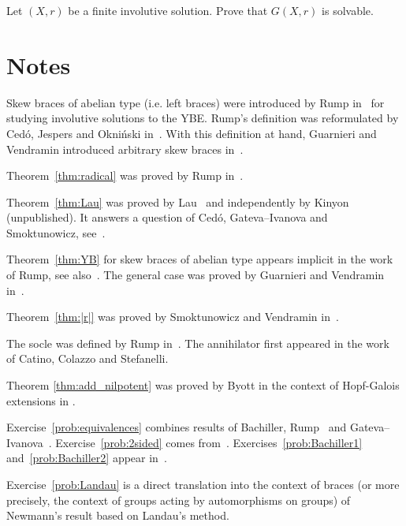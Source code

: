 \begin{prob}
\label{prob:G(X,r)solvable}
Let $(X,r)$ be a finite involutive solution. Prove that $G(X,r)$ is solvable. 
\end{prob}


\section*{Notes}

Skew braces of abelian type (i.e. left braces) were introduced by Rump in~\cite{MR2278047} for studying involutive
solutions to the YBE. 
Rump's definition was reformulated  
by Ced\'o, Jespers and Okni\'nski in~\cite{MR3177933}. With this definition at hand, 
Guarnieri and Vendramin introduced 
arbitrary skew braces in~\cite{MR3647970}. 


Theorem~\ref{thm:radical} was proved by Rump in~\cite{MR2278047}. 

Theorem~\ref{thm:Lau} was proved by Lau~\cite{MR4136750} and independently by Kinyon (unpublished). It answers 
a question of Ced\'o, Gateva--Ivanova and Smoktunowicz, see~\cite{MR3818285}. 

Theorem~\ref{thm:YB} for skew braces of abelian type appears implicit in the work~\cite{MR2278047} of Rump, see
also~\cite{MR3177933}. The general case was proved by Guarnieri and Vendramin in~\cite{MR3647970}. 

Theorem~\ref{thm:|r|} was proved by Smoktunowicz and Vendramin in~\cite{MR3763907}. 

The socle was defined by Rump in~\cite{MR2278047}. The annihilator first appeared in the work~\cite{MR3917122}  
of Catino, Colazzo and Stefanelli. 

Theorem \ref{thm:add_nilpotent} was proved by Byott in the context of Hopf-Galois extensions in \cite{MR3425626}. 


Exercise~\ref{prob:equivalences} combines results of Bachiller, Rump~\cite{MR2278047} and
Gateva--Ivanova~\cite{MR3861714}. 
Exercise~\ref{prob:2sided} comes from~\cite{MR3177933}. 
Exercises~\ref{prob:Bachiller1} and~\ref{prob:Bachiller2} appear in~\cite{MR3835326}.

Exercise~\ref{prob:Landau} is a direct translation into the context of braces 
(or more precisely, the context of groups acting by automorphisms on groups)   
of Newmann's result based on Landau's method. 

